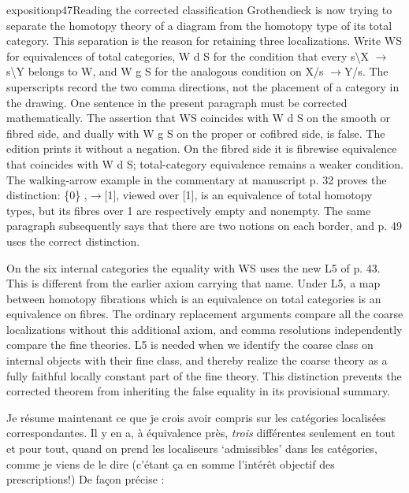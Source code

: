 \begin{dcomment}{exposition}{p47}{Reading the corrected classification}
Grothendieck is now trying to separate the homotopy theory of a diagram from the homotopy type of its total category. This separation is the reason for retaining three localizations. Write WS for equivalences of total categories, W d S for the condition that every s\textbackslash{}X \ensuremath{\to}s\textbackslash{}Y belongs to W, and W g S for the analogous condition on X/s \ensuremath{\to}Y/s. The superscripts record the two comma directions, not the placement of a category in the drawing. One sentence in the present paragraph must be corrected mathematically. The assertion that WS coincides with W d S on the smooth or fibred side, and dually with W g S on the proper or cofibred side, is false. The edition prints it without a negation. On the fibred side it is fibrewise equivalence that coincides with W d S; total-category equivalence remains a weaker condition. The walking-arrow example in the commentary at manuscript p. 32 proves the distinction: \{0\} ,\ensuremath{\to}[1], viewed over [1], is an equivalence of total homotopy types, but its fibres over 1 are respectively empty and nonempty. The same paragraph subsequently says that there are two notions on each border, and p. 49 uses the correct distinction.

On the six internal categories the equality with WS uses the new L5 of p. 43. This is different from the earlier axiom carrying that name. Under L5, a map between homotopy fibrations which is an equivalence on total categories is an equivalence on fibres. The ordinary replacement arguments compare all the coarse localizations without this additional axiom, and comma resolutions independently compare the fine theories. L5 is needed when we identify the coarse class on internal objects with their fine class, and thereby realize the coarse theory as a fully faithful locally constant part of the fine theory. This distinction prevents the corrected theorem from inheriting the false equality in its provisional summary.

\end{dcomment}


Je résume maintenant ce que je crois avoir compris sur les catégories localisées correspondantes. Il y en a, à équivalence près, \textit{trois} différentes seulement en tout et pour tout, quand on prend les localiseurs `admissibles' dans les catégories, comme je viens de le dire (c'étant ça en somme l'intérêt objectif des prescriptions!) De façon précise :

